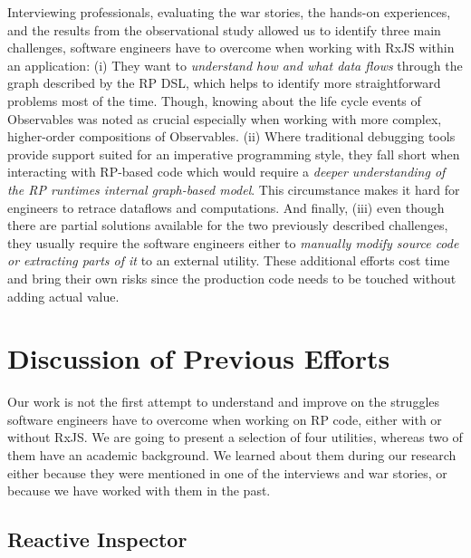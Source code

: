 \documentclass[12pt,a4paper]{article}
\begin{document}
Interviewing professionals, evaluating the war stories, the hands-on experiences, and the results from the observational study allowed us to identify three main challenges, software engineers have to overcome when working with RxJS within an application: (i) They want to \emph{understand how and what data flows} through the graph described by the RP DSL, which helps to identify more straightforward problems most of the time. Though, knowing about the life cycle events of Observables was noted as crucial especially when working with more complex, higher-order compositions of Observables. (ii) Where traditional debugging tools provide support suited for an imperative programming style, they fall short when interacting with RP-based code which would require a \emph{deeper understanding of the RP runtimes internal graph-based model}. This circumstance makes it hard for engineers to retrace dataflows and computations. And finally, (iii) even though there are partial solutions available for the two previously described challenges, they usually require the software engineers either to \emph{manually modify source code or extracting parts of it} to an external utility. These additional efforts cost time and bring their own risks since the production code needs to be touched without adding actual value.

\section{Discussion of Previous Efforts}
\label{sec:discussion}

Our work is not the first attempt to understand and improve on the struggles software engineers have to overcome when working on RP code, either with or without RxJS. We are going to present a selection of four utilities, whereas two of them have an academic background. We learned about them during our research either because they were mentioned in one of the interviews and war stories, or because we have worked with them in the past.

\subsection{Reactive Inspector}
\end{document}
